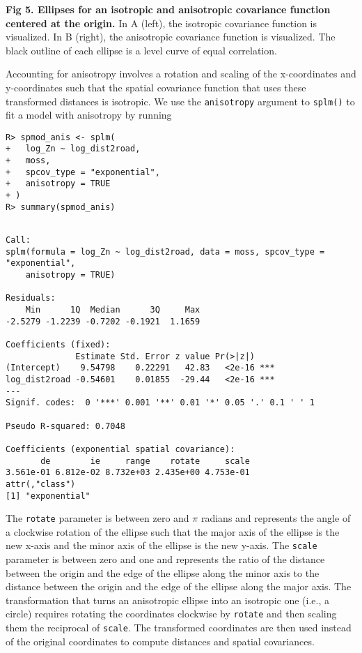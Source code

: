 \documentclass[10pt,letterpaper]{article}
\begin{document}
\textbf{Fig 5. Ellipses for an isotropic and anisotropic covariance
function centered at the origin.} In A (left), the isotropic covariance
function is visualized. In B (right), the anisotropic covariance
function is visualized. The black outline of each ellipse is a level
curve of equal correlation.

Accounting for anisotropy involves a rotation and scaling of the
x-coordinates and y-coordinates such that the spatial covariance
function that uses these transformed distances is isotropic. We use the
\texttt{anisotropy} argument to \texttt{splm()} to fit a model with
anisotropy by running

\begin{verbatim}
R> spmod_anis <- splm(
+   log_Zn ~ log_dist2road,
+   moss,
+   spcov_type = "exponential",
+   anisotropy = TRUE
+ )
R> summary(spmod_anis)
\end{verbatim}

\begin{verbatim}

Call:
splm(formula = log_Zn ~ log_dist2road, data = moss, spcov_type = "exponential", 
    anisotropy = TRUE)

Residuals:
    Min      1Q  Median      3Q     Max 
-2.5279 -1.2239 -0.7202 -0.1921  1.1659 

Coefficients (fixed):
              Estimate Std. Error z value Pr(>|z|)    
(Intercept)    9.54798    0.22291   42.83   <2e-16 ***
log_dist2road -0.54601    0.01855  -29.44   <2e-16 ***
---
Signif. codes:  0 '***' 0.001 '**' 0.01 '*' 0.05 '.' 0.1 ' ' 1

Pseudo R-squared: 0.7048

Coefficients (exponential spatial covariance):
       de        ie     range    rotate     scale 
3.561e-01 6.812e-02 8.732e+03 2.435e+00 4.753e-01 
attr(,"class")
[1] "exponential"
\end{verbatim}

\noindent The \texttt{rotate} parameter is between zero and \(\pi\)
radians and represents the angle of a clockwise rotation of the ellipse
such that the major axis of the ellipse is the new x-axis and the minor
axis of the ellipse is the new y-axis. The \texttt{scale} parameter is
between zero and one and represents the ratio of the distance between
the origin and the edge of the ellipse along the minor axis to the
distance between the origin and the edge of the ellipse along the major
axis. The transformation that turns an anisotropic ellipse into an
isotropic one (i.e., a circle) requires rotating the coordinates
clockwise by \texttt{rotate} and then scaling them the reciprocal of
\texttt{scale}. The transformed coordinates are then used instead of the
original coordinates to compute distances and spatial covariances.
\end{document}
